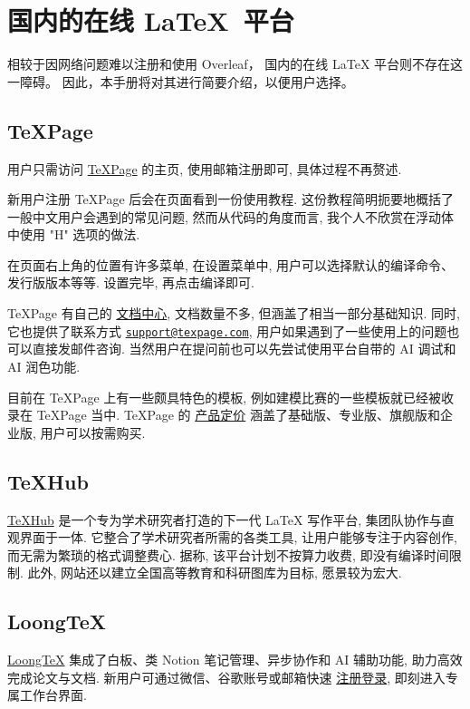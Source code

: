 \section{国内的在线 \LaTeX\ 平台}

相较于因网络问题难以注册和使用 Overleaf，
国内的在线 \LaTeX{} 平台则不存在这一障碍。
因此，本手册将对其进行简要介绍，以便用户选择。

\subsection{TeXPage}

用户只需访问 \href{https://www.texpage.com/}{TeXPage} 的主页,
使用邮箱注册即可,
具体过程不再赘述.

新用户注册 TeXPage 后会在页面看到一份使用教程.
这份教程简明扼要地概括了一般中文用户会遇到的常见问题,
然而从代码的角度而言,
我个人不欣赏在浮动体中使用 "H" 选项的做法.

在页面右上角的位置有许多菜单,
在\textsf{设置}菜单中,
用户可以选择默认的编译命令、发行版版本等等.
设置完毕,
再点击编译即可.

TeXPage 有自己的%
\href{https://www.texpage.com/docs}{文档中心},
文档数量不多,
但涵盖了相当一部分基础知识.
同时,
它也提供了联系方式 \href{mailto:support@texpage.com}%
{\texttt{support@texpage.com}},
用户如果遇到了一些使用上的问题也可以直接发邮件咨询.
当然用户在提问前也可以先尝试使用平台自带的 AI 调试和 AI 润色功能.

目前在 TeXPage 上有一些颇具特色的模板,
例如建模比赛的一些模板就已经被收录在 TeXPage 当中.
TeXPage 的%
\href{https://www.texpage.com/zh/pricing}{产品定价}%
涵盖了基础版、专业版、旗舰版和企业版,
用户可以按需购买.

\subsection{TeXHub}

\href{https://www.texhub.com/}{TeXHub} 是一个专为学术研究者打造的下一代 \LaTeX{} 写作平台,
集团队协作与直观界面于一体.
它整合了学术研究者所需的各类工具,
让用户能够专注于内容创作,
而无需为繁琐的格式调整费心.
据称,
该平台计划不按算力收费,
即没有编译时间限制.
此外,
网站还以建立全国高等教育和科研图库为目标,
愿景较为宏大.

\subsection{LoongTeX}

\href{https://www.loongtex.com/}{LoongTeX}
集成了白板、类 Notion 笔记管理、异步协作和 AI 辅助功能, 助力高效完成论文与文档.
新用户可通过微信、谷歌账号或邮箱快速%
\href{https://app.loongtex.com/user/login}{注册登录},
即刻进入专属工作台界面.

